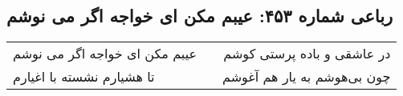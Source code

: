 \begin{center}
\section*{رباعی شماره ۴۵۳: عیبم مکن ای خواجه اگر می نوشم}
\label{sec:sh453}
\begin{longtable}{l p{0.5cm} r}
عیبم مکن ای خواجه اگر می نوشم
&&
در عاشقی و باده پرستی کوشم
\\
تا هشیارم نشسته با اغیارم
&&
چون بی‌هوشم به یار هم آغوشم
\\
\end{longtable}
\end{center}
